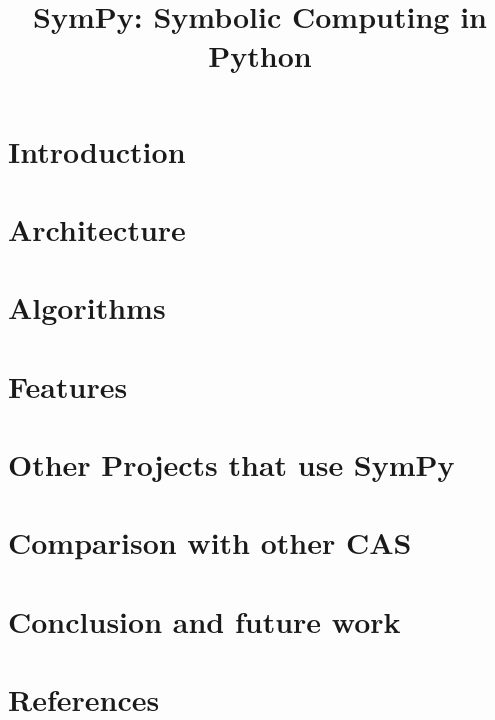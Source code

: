 \documentclass[review]{siamart0216}
\title{SymPy: Symbolic Computing in Python}
\begin{document}
\maketitle

\section{Introduction}




\section{Architecture}



\section{Algorithms}




\section{Features}






\section{Other Projects that use SymPy}



\section{Comparison with other CAS}



\section{Conclusion and future work}



\section{References}



\end{document}
